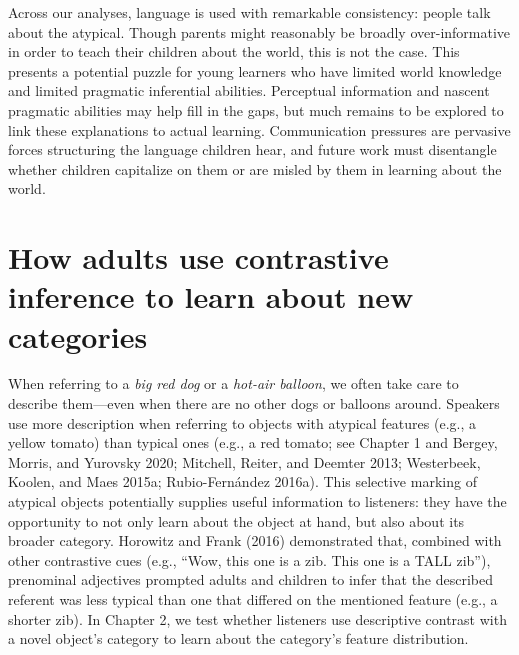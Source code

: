 \documentclass{ucetd}
\begin{document}
Across our analyses, language is used with remarkable consistency:
people talk about the atypical. Though parents might reasonably be
broadly over-informative in order to teach their children about the
world, this is not the case. This presents a potential puzzle for young
learners who have limited world knowledge and limited pragmatic
inferential abilities. Perceptual information and nascent pragmatic
abilities may help fill in the gaps, but much remains to be explored to
link these explanations to actual learning. Communication pressures are
pervasive forces structuring the language children hear, and future work
must disentangle whether children capitalize on them or are misled by
them in learning about the world.

\hypertarget{how-adults-use-contrastive-inference-to-learn-about-new-categories}{%
\chapter{How adults use contrastive inference to learn about new
categories}\label{how-adults-use-contrastive-inference-to-learn-about-new-categories}}

When referring to a \emph{big red dog} or a \emph{hot-air balloon}, we
often take care to describe them---even when there are no other dogs or
balloons around. Speakers use more description when referring to objects
with atypical features (e.g., a yellow tomato) than typical ones (e.g.,
a red tomato; see Chapter 1 and Bergey, Morris, and Yurovsky 2020;
Mitchell, Reiter, and Deemter 2013; Westerbeek, Koolen, and Maes 2015a;
Rubio-Fernández 2016a). This selective marking of atypical objects
potentially supplies useful information to listeners: they have the
opportunity to not only learn about the object at hand, but also about
its broader category. Horowitz and Frank (2016) demonstrated that,
combined with other contrastive cues (e.g., ``Wow, this one is a zib.
This one is a TALL zib''), prenominal adjectives prompted adults and
children to infer that the described referent was less typical than one
that differed on the mentioned feature (e.g., a shorter zib). In Chapter
2, we test whether listeners use descriptive contrast with a novel
object's category to learn about the category's feature distribution.
\end{document}
